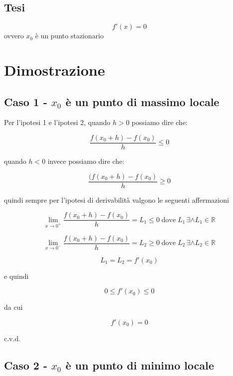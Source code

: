 \documentclass[../dimostrazioni]{subfiles}
\begin{document}
            \subsection*{Tesi}

                \[f'(x) = 0\] ovvero \(x_0\) è un punto stazionario

        \section*{Dimostrazione}

            \medskip

            \subsection*{Caso 1 - \(x_0\) è un punto di massimo locale}

                \smallskip

                Per l'ipotesi 1 e l'ipotesi 2, quando \(h>0\) possiamo dire che:
                
                \[\frac{f(x_0 + h) - f(x_0)}{h}  \leqslant 0\]

                quando \(h<0\) invece possiamo dire che:

                \[\frac{(f(x_0 + h) - f(x_0)}{h}  \geqslant 0\]

                quindi sempre per l'ipotesi di derivabilità valgono le seguenti affermazioni
                
                \[\lim_{x\to 0^+} \frac{f(x_0 + h) - f(x_0)}{h} = L_1 \leqslant 0 \; \text{dove} \; L_1 \, \exists \land L_1 \in \mathbb{R} \]

                \[\lim_{x\to 0^-} \frac{f(x_0 + h) - f(x_0)}{h} = L_2  \geqslant 0 \; \text{dove} \; L_2 \, \exists \land L_2 \in \mathbb{R} \]

                \[L_1 = L_2 = f'(x_0)\]
                
                e quindi
                
                \[0 \leqslant f'(x_0) \leqslant 0\]
                
                da cui
                
                \[f'(x_0)=0\]
                
                c.v.d.

            \subsection*{Caso 2 - \(x_0\) è un punto di minimo locale}
\end{document}
